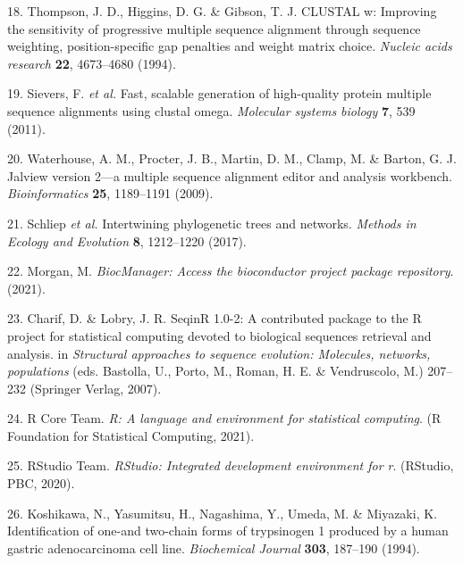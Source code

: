 \documentclass[
]{article}
\begin{document}
\leavevmode\hypertarget{ref-thompson1994clustal}{}%
18. Thompson, J. D., Higgins, D. G. \& Gibson, T. J. CLUSTAL w: Improving the sensitivity of progressive multiple sequence alignment through sequence weighting, position-specific gap penalties and weight matrix choice. \emph{Nucleic acids research} \textbf{22}, 4673--4680 (1994).

\leavevmode\hypertarget{ref-sievers2011fast}{}%
19. Sievers, F. \emph{et al.} Fast, scalable generation of high-quality protein multiple sequence alignments using clustal omega. \emph{Molecular systems biology} \textbf{7}, 539 (2011).

\leavevmode\hypertarget{ref-waterhouse2009jalview}{}%
20. Waterhouse, A. M., Procter, J. B., Martin, D. M., Clamp, M. \& Barton, G. J. Jalview version 2---a multiple sequence alignment editor and analysis workbench. \emph{Bioinformatics} \textbf{25}, 1189--1191 (2009).

\leavevmode\hypertarget{ref-phangorn2011package}{}%
21. Schliep \emph{et al.} Intertwining phylogenetic trees and networks. \emph{Methods in Ecology and Evolution} \textbf{8}, 1212--1220 (2017).

\leavevmode\hypertarget{ref-manager2021package}{}%
22. Morgan, M. \emph{BiocManager: Access the bioconductor project package repository}. (2021).

\leavevmode\hypertarget{ref-seqinr2007package}{}%
23. Charif, D. \& Lobry, J. R. SeqinR 1.0-2: A contributed package to the R project for statistical computing devoted to biological sequences retrieval and analysis. in \emph{Structural approaches to sequence evolution: Molecules, networks, populations} (eds. Bastolla, U., Porto, M., Roman, H. E. \& Vendruscolo, M.) 207--232 (Springer Verlag, 2007).

\leavevmode\hypertarget{ref-r2021language}{}%
24. R Core Team. \emph{R: A language and environment for statistical computing}. (R Foundation for Statistical Computing, 2021).

\leavevmode\hypertarget{ref-rstudio2020ide}{}%
25. RStudio Team. \emph{RStudio: Integrated development environment for r}. (RStudio, PBC, 2020).

\leavevmode\hypertarget{ref-koshikawa1994identification}{}%
26. Koshikawa, N., Yasumitsu, H., Nagashima, Y., Umeda, M. \& Miyazaki, K. Identification of one-and two-chain forms of trypsinogen 1 produced by a human gastric adenocarcinoma cell line. \emph{Biochemical Journal} \textbf{303}, 187--190 (1994).
\end{document}
